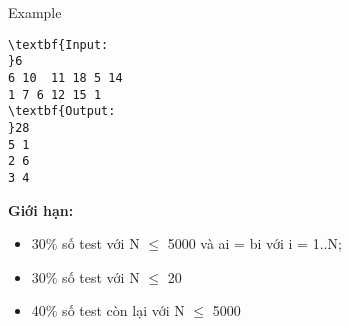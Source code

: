 Example
\begin{verbatim}
\textbf{Input:
}6
6 10  11 18 5 14
1 7 6 12 15 1
\textbf{Output:
}28
5 1
2 6
3 4
\end{verbatim}

\textbf{Giới hạn:}
\begin{itemize}
	\item 30\% số test với N  $\le$  5000 và ai = bi với i = 1..N;
	\item 30\% số test với N  $\le$  20
	\item 40\% số test còn lại với N  $\le$  5000 
\end{itemize}